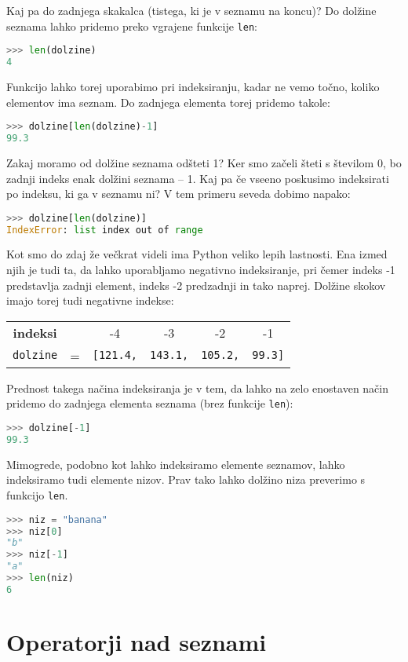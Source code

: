 Kaj pa do zadnjega skakalca (tistega, ki je v seznamu na koncu)? Do dolžine seznama lahko pridemo preko vgrajene funkcije \texttt{len}:
\begin{lstlisting}[language=Python]
>>> len(dolzine)
4
\end{lstlisting}
Funkcijo lahko torej uporabimo pri indeksiranju, kadar ne vemo točno, koliko elementov ima seznam. Do zadnjega elementa torej pridemo takole:
\begin{lstlisting}[language=Python]
>>> dolzine[len(dolzine)-1]
99.3
\end{lstlisting}
Zakaj moramo od dolžine seznama odšteti 1? Ker smo začeli šteti s številom 0, bo zadnji indeks enak dolžini seznama -- 1. Kaj pa če vseeno poskusimo indeksirati po indeksu, ki ga v seznamu ni? V tem primeru seveda dobimo napako:
\begin{lstlisting}[language=Python]
>>> dolzine[len(dolzine)]
IndexError: list index out of range
\end{lstlisting}
Kot smo do zdaj že večkrat videli ima Python veliko lepih lastnosti. Ena izmed njih je tudi ta, da lahko uporabljamo negativno indeksiranje, pri čemer indeks -1 predstavlja zadnji element, indeks -2 predzadnji in tako naprej. Dolžine skokov imajo torej tudi negativne indekse:

\begin{tabular}{cccccc}
\textbf{indeksi} & & -4 & -3 & -2 & -1\\
\texttt{dolzine} & = & \texttt{[121.4,}& \texttt{143.1,} & \texttt{105.2,} & \texttt{99.3]}
\end{tabular}

\bigskip

Prednost takega načina indeksiranja je v tem, da lahko na zelo enostaven način pridemo do zadnjega elementa seznama (brez funkcije \texttt{len}):
\begin{lstlisting}[language=Python]
>>> dolzine[-1]
99.3
\end{lstlisting}

Mimogrede, podobno kot lahko indeksiramo elemente seznamov, lahko indeksiramo tudi elemente nizov. Prav tako lahko dolžino niza preverimo s funkcijo \texttt{len}.
\begin{lstlisting}[language=Python]
>>> niz = "banana"
>>> niz[0]
"b"
>>> niz[-1]
"a"
>>> len(niz)
6
\end{lstlisting}

\section{Operatorji nad seznami}

